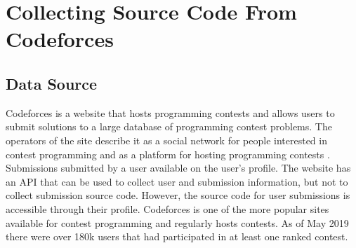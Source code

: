 \documentclass[12pt]{article}
\begin{document}
\section{Collecting Source Code From Codeforces}


\subsection{Data Source}
\begin{sloppypar}
Codeforces is a website that hosts programming contests and allows users to submit solutions to a large database of programming contest problems. The operators of the site describe it as a social network for people interested in contest programming and as a platform for hosting programming contests \cite{WEBSITE:CF1}. Submissions submitted by a user available on the user's profile. The website has an API that can be used to collect user and submission information, but not to collect submission source code. However, the source code for user submissions is accessible through their profile. Codeforces is one of the more popular sites available for contest programming and regularly hosts contests. As of May 2019 there were over 180k users that had participated in at least one ranked contest.
\end{sloppypar}

\end{document}
